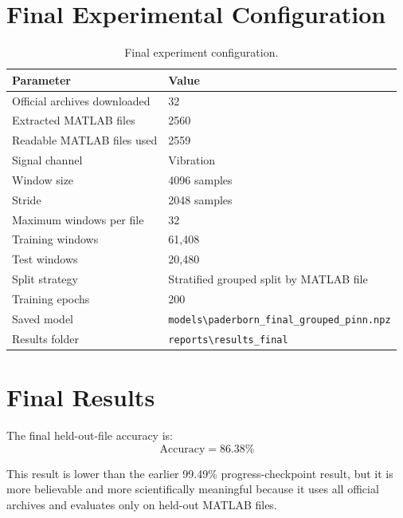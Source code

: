 \documentclass[11pt,a4paper]{article}
\begin{document}
\section{Final Experimental Configuration}
\begin{table}[H]
\centering
\caption{Final experiment configuration.}
\label{tab:experiment}
\begin{tabular}{ll}
\toprule
\textbf{Parameter} & \textbf{Value} \\
\midrule
Official archives downloaded & 32 \\
Extracted MATLAB files & 2560 \\
Readable MATLAB files used & 2559 \\
Signal channel & Vibration \\
Window size & 4096 samples \\
Stride & 2048 samples \\
Maximum windows per file & 32 \\
Training windows & 61,408 \\
Test windows & 20,480 \\
Split strategy & Stratified grouped split by MATLAB file \\
Training epochs & 200 \\
Saved model & \texttt{models\textbackslash paderborn\_final\_grouped\_pinn.npz} \\
Results folder & \texttt{reports\textbackslash results\_final} \\
\bottomrule
\end{tabular}
\end{table}

\section{Final Results}
The final held-out-file accuracy is:
\[
\boxed{\text{Accuracy} = 86.38\%}
\]

This result is lower than the earlier 99.49\% progress-checkpoint result, but it is more believable and more scientifically meaningful because it uses all official archives and evaluates only on held-out MATLAB files.

\begin{table}[H]
\centering
\caption{Class-wise precision, recall, and F1-score for the final grouped evaluation.}
\label{tab:classmetrics}

\end{table}
\end{document}
